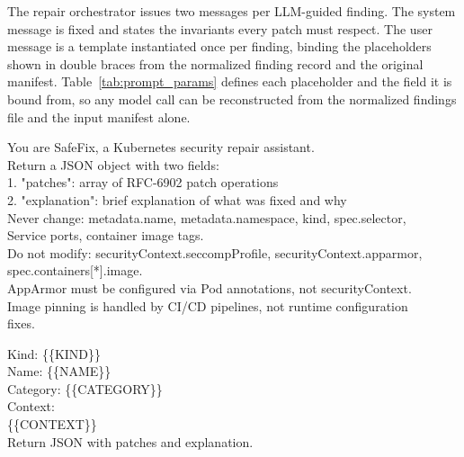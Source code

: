 \documentclass[preprint,12pt]{elsarticle}
\newcommand{\new}[1]{#1}
\begin{document}
\new{The repair orchestrator issues two messages per LLM-guided finding. The
system message is fixed and states the invariants every patch must respect.
The user message is a template instantiated once per finding, binding the
placeholders shown in double braces from the normalized finding record and
the original manifest. Table~\ref{tab:prompt_params} defines each placeholder
and the field it is bound from, so any model call can be reconstructed from
the normalized findings file and the input manifest alone.}

\begin{tcolorbox}[
    colback=gray!5!white,
    colframe=gray!75!black,
    title=System message,
    fonttitle=\bfseries,
    breakable
]
\small\ttfamily
You are SafeFix, a Kubernetes security repair assistant.\\
Return a JSON object with two fields:\\
\hspace*{1em}1. "patches": array of RFC-6902 patch operations\\
\hspace*{1em}2. "explanation": brief explanation of what was fixed and why\\[6pt]
Never change: metadata.name, metadata.namespace, kind, spec.selector,\\
Service ports, container image tags.\\
Do not modify: securityContext.seccompProfile, securityContext.apparmor,\\
spec.containers[*].image.\\
AppArmor must be configured via Pod annotations, not securityContext.\\
Image pinning is handled by CI/CD pipelines, not runtime configuration\\
fixes.
\end{tcolorbox}

\begin{tcolorbox}[
    colback=gray!5!white,
    colframe=gray!75!black,
    title=User message template (instantiated per finding),
    fonttitle=\bfseries,
    breakable
]
\small\ttfamily
Kind: \{\{KIND\}\}\\
Name: \{\{NAME\}\}\\
Category: \{\{CATEGORY\}\}\\[6pt]
Context:\\
\{\{CONTEXT\}\}\\[6pt]
Return JSON with patches and explanation.
\end{tcolorbox}
\end{document}
